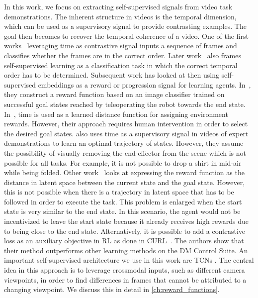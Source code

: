 \documentclass[\home/main.tex]{subfiles}
\begin{document}
In this work, we focus on extracting self-supervised signals from video task demonstrations. The inherent structure in videos is the temporal dimension, which can be used as a supervisory signal to provide contrasting examples. The goal then becomes to recover the temporal coherence of a video. One of the first works~\cite{Misra2016} leveraging time as contrastive signal inputs a sequence of frames and classifies whether the frames are in the correct order. Later work~\cite{Lee2017,Fernando2017} also frames self-supervised learning as a classification task in which the correct temporal order has to be determined. Subsequent work has looked at then using self-supervised embeddings as a reward or progression signal for learning agents.
In~\cite{Singh2019}, they construct a reward function based on an image classifier trained on successful goal states reached by teleoperating the robot towards the end state. In~\cite{Hartikainen2019}, time is used as a learned distance function for assigning environment rewards. However, their approach requires human intervention in order to select the desired goal states. \cite{Nair2018time} also uses time as a supervisory signal in videos of expert demonstrations to learn an optimal trajectory of states. However, they assume the possibility of visually removing the end-effector from the scene which is not possible for all tasks. For example, it is not possible to drop a shirt in mid-air while being folded. Other work~\cite{Nair2018visual} looks at expressing the reward function as the distance in latent space between the current state and the goal state. However, this is not possible when there is a trajectory in latent space that has to be followed in order to execute the task. This problem is enlarged when the start state is very similar to the end state. In this scenario, the agent would not be incentivized to leave the start state because it already receives high rewards due to being close to the end state. %
Alternatively, it is possible to add a contrastive loss as an auxiliary objective in RL as done in CURL~\cite{Srinivas2020CURL}. The authors show that their method outperforms other learning methods on the DM Control Suite.
An important self-supervised architecture we use in this work are \glspl{TCN} \autocite{Sermanet2017TCN}. The central idea in this approach is to leverage crossmodal inputs, such as different camera viewpoints, in order to find differences in frames that cannot be attributed to a changing viewpoint. We discuss this in detail in \cref{ch:reward_functions}.
\end{document}

